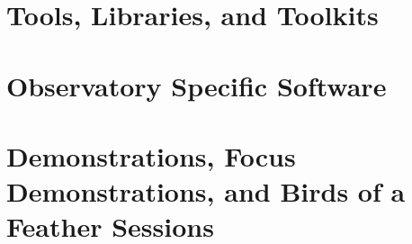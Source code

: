 \documentclass[11pt,twoside]{book}
\begin{document}
\part{Tools, Libraries, and Toolkits}
\part{Observatory Specific Software}
\part{Demonstrations, Focus Demonstrations, and Birds of a Feather Sessions}




\bookblankpage %

\tocinsertvspace{5.5ex} %

\backmatter



\end{document}
